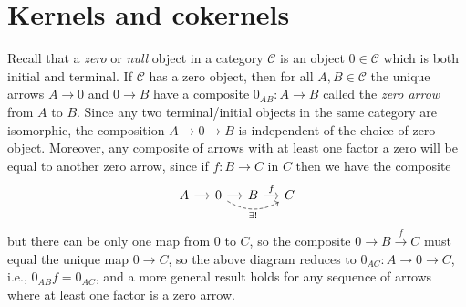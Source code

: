 \documentclass[10pt,oneside]{book}
\def\~#1{\mathscr{#1}}
\def\To#1{\xrightarrow{#1}}
\theoremstyle{plain}
\theoremstyle{definition}
\theoremstyle{remark}
\numberwithin{equation}{section}
\numberwithin{figure}{section}
\begin{document}
\section{Kernels and cokernels}
Recall that a \emph{zero} or \emph{null} object in a category $\~C$ is an object $0 \in \~C$ which is both initial and terminal. If $\~C$ has a zero object, then for all $A, B \in \~C$ the unique arrows $A \to 0$ and $0 \to B$ have a composite $0_{AB}: A \to B$ called the \emph{zero arrow} from $A$ to $B$. Since any two terminal/initial objects in the same category are isomorphic, the composition $A \to 0 \to B$ is independent of the choice of zero object. Moreover, any composite of arrows with at least one factor a zero will be equal to another zero arrow, since if $f: B \to C$ in $C$ then we have the composite
\[\begin{tikzcd}[column sep =small]
    A & 0 & B & C
    \arrow[from=1-1, to=1-2]
    \arrow[from=1-2, to=1-3]
    \arrow["{\exists!}"', bend right, dashed, from=1-2, to=1-4]
    \arrow["f", from=1-3, to=1-4]
\end{tikzcd}\]
but there can be only one map from $0$ to $C$, so the composite $0 \to B \To{f} C$ must equal the unique map $0 \to C$, so the above diagram reduces to $0_{AC}: A \to 0 \to C$, i.e., $0_{AB} f = 0_{AC}$, and a more general result holds for any sequence of arrows where at least one factor is a zero arrow. 
\end{document}

